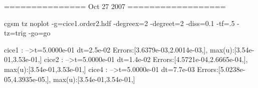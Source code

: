 

=============== Oct 27 2007 ==================

cgsm tz noplot -g=cice1.order2.hdf -degreex=2 -degreet=2 -diss=0.1 -tf=.5 -tz=trig -go=go


cice1 : -->t=5.0000e-01 dt=2.5e-02 Errors:[3.6379e-03,2.0014e-03,], max(u):[3.54e-01,3.53e-01,]
cice2 : -->t=5.0000e-01 dt=1.4e-02 Errors:[4.5721e-04,2.6665e-04,], max(u):[3.54e-01,3.53e-01,]
cice4 : -->t=5.0000e-01 dt=7.7e-03 Errors:[5.0238e-05,4.3935e-05,], max(u):[3.54e-01,3.54e-01,]
